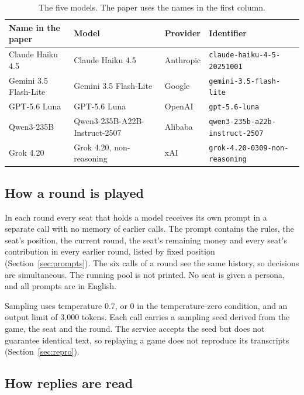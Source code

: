 \documentclass[10pt]{article}
\let\plainsubsection\subsection
\renewcommand{\subsection}{\FloatBarrier\needspace{8\baselineskip}\plainsubsection}
\begin{document}
\begin{table}[h]
\caption{The five models. The paper uses the names in the first column.}
\label{tab:models}
\centering\small
\begin{tabular}{@{}llll@{}}
\toprule
Name in the paper & Model & Provider & Identifier \\
\midrule
Claude Haiku 4.5 & Claude Haiku 4.5 & Anthropic & \texttt{claude-haiku-4-5-20251001} \\
Gemini 3.5 Flash-Lite & Gemini 3.5 Flash-Lite & Google & \texttt{gemini-3.5-flash-lite} \\
GPT-5.6 Luna & GPT-5.6 Luna & OpenAI & \texttt{gpt-5.6-luna} \\
Qwen3-235B & Qwen3-235B-A22B-Instruct-2507 & Alibaba & \texttt{qwen3-235b-a22b-instruct-2507} \\
Grok 4.20 & Grok 4.20, non-reasoning & xAI & \texttt{grok-4.20-0309-non-reasoning} \\
\bottomrule
\end{tabular}
\end{table}

\subsection{How a round is played}

In each round every seat that holds a model receives its own prompt in a separate call with no memory of earlier calls. The prompt contains the rules, the seat's position, the current round, the seat's remaining money and every seat's contribution in every earlier round, listed by fixed position (Section~\ref{sec:prompts}). The six calls of a round see the same history, so decisions are simultaneous. The running pool is not printed. No seat is given a persona, and all prompts are in English.

Sampling uses temperature 0.7, or 0 in the temperature-zero condition, and an output limit of 3,000 tokens. Each call carries a sampling seed derived from the game, the seat and the round. The service accepts the seed but does not guarantee identical text, so replaying a game does not reproduce its transcripts (Section~\ref{sec:repro}).

\subsection{How replies are read}
\label{sec:parse}
\end{document}
